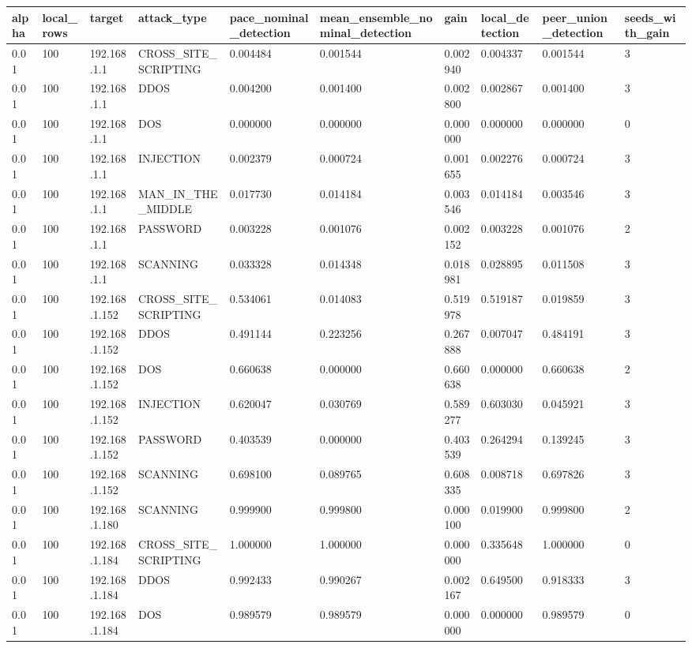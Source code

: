 \begin{tabular}{llllllllll}
\toprule
alpha & local\_rows & target & attack\_type & pace\_nominal\_detection & mean\_ensemble\_nominal\_detection & gain & local\_detection & peer\_union\_detection & seeds\_with\_gain \\
\midrule
0.01 & 100 & 192.168.1.1 & CROSS\_SITE\_SCRIPTING & 0.004484 & 0.001544 & 0.002940 & 0.004337 & 0.001544 & 3 \\
0.01 & 100 & 192.168.1.1 & DDOS & 0.004200 & 0.001400 & 0.002800 & 0.002867 & 0.001400 & 3 \\
0.01 & 100 & 192.168.1.1 & DOS & 0.000000 & 0.000000 & 0.000000 & 0.000000 & 0.000000 & 0 \\
0.01 & 100 & 192.168.1.1 & INJECTION & 0.002379 & 0.000724 & 0.001655 & 0.002276 & 0.000724 & 3 \\
0.01 & 100 & 192.168.1.1 & MAN\_IN\_THE\_MIDDLE & 0.017730 & 0.014184 & 0.003546 & 0.014184 & 0.003546 & 3 \\
0.01 & 100 & 192.168.1.1 & PASSWORD & 0.003228 & 0.001076 & 0.002152 & 0.003228 & 0.001076 & 2 \\
0.01 & 100 & 192.168.1.1 & SCANNING & 0.033328 & 0.014348 & 0.018981 & 0.028895 & 0.011508 & 3 \\
0.01 & 100 & 192.168.1.152 & CROSS\_SITE\_SCRIPTING & 0.534061 & 0.014083 & 0.519978 & 0.519187 & 0.019859 & 3 \\
0.01 & 100 & 192.168.1.152 & DDOS & 0.491144 & 0.223256 & 0.267888 & 0.007047 & 0.484191 & 3 \\
0.01 & 100 & 192.168.1.152 & DOS & 0.660638 & 0.000000 & 0.660638 & 0.000000 & 0.660638 & 2 \\
0.01 & 100 & 192.168.1.152 & INJECTION & 0.620047 & 0.030769 & 0.589277 & 0.603030 & 0.045921 & 3 \\
0.01 & 100 & 192.168.1.152 & PASSWORD & 0.403539 & 0.000000 & 0.403539 & 0.264294 & 0.139245 & 3 \\
0.01 & 100 & 192.168.1.152 & SCANNING & 0.698100 & 0.089765 & 0.608335 & 0.008718 & 0.697826 & 3 \\
0.01 & 100 & 192.168.1.180 & SCANNING & 0.999900 & 0.999800 & 0.000100 & 0.019900 & 0.999800 & 2 \\
0.01 & 100 & 192.168.1.184 & CROSS\_SITE\_SCRIPTING & 1.000000 & 1.000000 & 0.000000 & 0.335648 & 1.000000 & 0 \\
0.01 & 100 & 192.168.1.184 & DDOS & 0.992433 & 0.990267 & 0.002167 & 0.649500 & 0.918333 & 3 \\
0.01 & 100 & 192.168.1.184 & DOS & 0.989579 & 0.989579 & 0.000000 & 0.000000 & 0.989579 & 0 \\

\end{tabular}
